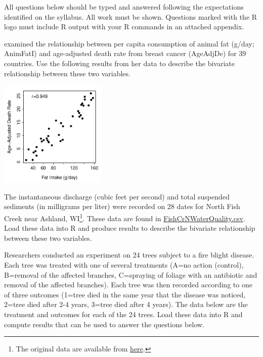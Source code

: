 \documentclass[10pt,openany]{book}\usepackage[]{graphicx}\usepackage[]{color}
\begin{document}
\newpage
\begin{hwsection}{All questions below should be typed and answered following the expectations identified on the syllabus.  All work must be shown.  Questions marked with the R logo must include R output with your R commands in an attached appendix.}

  \item \label{hwprob:qbEDACarr} \cite{Carroll1975} examined the relationship between per capita consumption of animal fat (g/day; AnimFatI) and age-adjusted death rate from breast cancer (AgeAdjDe) for 39 countries.  Use the following results from her data to describe the bivariate relationship between these two variables.

\begin{center}
  \includegraphics[width=2in]{Figs/ScatCancerFat-1}
\end{center}

  \item \label{hwprob:qbEDAFishCr} \rhw{} The instantaneous discharge (cubic feet per second) and total suspended sediments (in milligrams per liter) were recorded on 28 dates for North Fish Creek near Ashland, WI\footnote{The original data are available from \href{http://nwis.waterdata.usgs.gov/wi/nwis/qwdata/?site_no=040263491}{here}.}.  These data are found in \href{https://raw.githubusercontent.com/droglenc/NCData/master/FishCrNWaterQuality.csv}{FishCrNWaterQuality.csv}.  Load these data into R and produce results to describe the bivariate relationship between these two variables.

  \item \label{hwprob:cbEDABlight} \rhw{} Researchers conducted an experiment on 24 trees subject to a fire blight disease.  Each tree was treated with one of several treatments (A=no action (control), B=removal of the affected branches, C=spraying of foliage with an antibiotic and removal of the affected branches).  Each tree was then recorded according to one of three outcomes (1=tree died in the same year that the disease was noticed, 2=tree died after 2-4 years, 3=tree died after 4 years).  The data below are the treatment and outcomes for each of the 24 trees.  Load these data into R and compute results that can be used to answer the questions below.


\end{hwsection}
\end{document}
